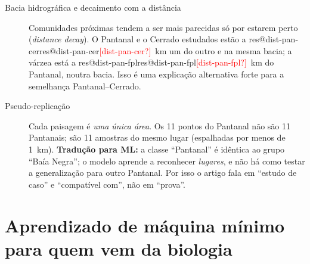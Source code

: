 \documentclass[11pt,a4paper]{article}
\makeatletter
\newcommand{\res}[1]{\ifcsname res@#1\endcsname\csname res@#1\endcsname\else\textcolor{red}{[#1?]}\fi}
\makeatother
\begin{document}
\begin{description}
\item[Bacia hidrográfica e decaimento com a distância] Comunidades próximas tendem a ser mais
parecidas só por estarem perto (\emph{distance decay}). O Pantanal e o Cerrado estudados estão a
\res{dist-pan-cer}~km um do outro e na mesma bacia; a várzea está a \res{dist-pan-fpl}~km do
Pantanal, noutra bacia. Isso é uma explicação alternativa forte para a semelhança Pantanal--Cerrado.

\item[Pseudo-replicação] Cada paisagem é \emph{uma única área}. Os 11 pontos do Pantanal não são
11 Pantanais; são 11 amostras do mesmo lugar (espalhadas por menos de 1~km). \textbf{Tradução
para ML:} a classe ``Pantanal'' é idêntica ao grupo ``Baía Negra''; o modelo aprende a reconhecer
\emph{lugares}, e não há como testar a generalização para outro Pantanal. Por isso o artigo
fala em ``estudo de caso'' e ``compatível com'', não em ``prova''.
\end{description}

\section{Aprendizado de máquina mínimo para quem vem da biologia}
\end{document}
